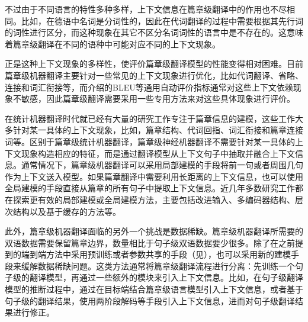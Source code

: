 \parinterval  不过由于不同语言的特性多种多样，上下文信息在篇章级翻译中的作用也不尽相同。比如，在德语中名词是分词性的，因此在代词翻译的过程中需要根据其先行词的词性进行区分，而这种现象在其它不区分名词词性的语言中是不存在的。这意味着篇章级翻译在不同的语种中可能对应不同的上下文现象。

\parinterval 正是这种上下文现象的多样性，使评价篇章级翻译模型的性能变得相对困难。目前篇章级机器翻译主要针对一些常见的上下文现象进行优化，比如代词翻译、省略、连接和词汇衔接等，而{\chapterfour}介绍的BLEU等通用自动评价指标通常对这些上下文依赖现象不敏感，因此篇章级翻译需要采用一些专用方法来对这些具体现象进行评价。

\parinterval 在统计机器翻译时代就已经有大量的研究工作专注于篇章信息的建模，这些工作大多针对某一具体的上下文现象，比如，篇章结构、代词回指、词汇衔接和篇章连接词等。区别于篇章级统计机器翻译，篇章级神经机器翻译不需要针对某一具体的上下文现象构造相应的特征，而是通过翻译模型从上下文句子中抽取并融合上下文信息。通常情况下，篇章级机器翻译可以采用局部建模的手段将前一句或者周围几句作为上下文送入模型。如果篇章翻译中需要利用长距离的上下文信息，也可以使用全局建模的手段直接从篇章的所有句子中提取上下文信息。近几年多数研究工作都在探索更有效的局部建模或全局建模方法，主要包括改进输入、多编码器结构、层次结构以及基于缓存的方法等。

\parinterval 此外，篇章级机器翻译面临的另外一个挑战是数据稀缺。篇章级机器翻译所需要的双语数据需要保留篇章边界，数量相比于句子级双语数据要少很多。除了在之前提到的端到端方法中采用预训练或者参数共享的手段（见{\chaptersixteen}），也可以采用新的建模手段来缓解数据稀缺问题。这类方法通常将篇章级翻译流程进行分离：先训练一个句子级的翻译模型，再通过一些额外的模块来引入上下文信息。比如，在句子级翻译模型的推断过程中，通过在目标端结合篇章级语言模型引入上下文信息，或者基于句子级的翻译结果，使用两阶段解码等手段引入上下文信息，进而对句子级翻译结果进行修正。

